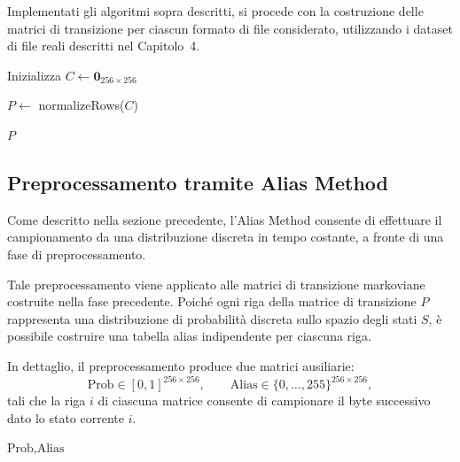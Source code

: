 \documentclass{report}
\begin{document}
\bigskip

Implementati gli algoritmi sopra descritti, si procede con la costruzione delle matrici di transizione
per ciascun formato di file considerato, utilizzando i dataset di file reali
descritti nel Capitolo~4.

\bigskip

\begin{algorithm}[H]
\caption{BuildTransitionMatrix}


Inizializza $C \gets \mathbf{0}_{256 \times 256}$\;


$P \gets$ normalizeRows($C$)\;

\Return $P$\;
\end{algorithm}



\subsection{Preprocessamento tramite Alias Method}

Come descritto nella sezione precedente, l’Alias Method consente di effettuare
il campionamento da una distribuzione discreta in tempo costante, a fronte di
una fase di preprocessamento.

\bigskip

Tale preprocessamento viene applicato alle
matrici di transizione markoviane costruite nella fase precedente. Poiché ogni
riga della matrice di transizione \(P\) rappresenta una distribuzione di
probabilità discreta sullo spazio degli stati \(S\), è possibile costruire una
tabella alias indipendente per ciascuna riga.

\bigskip

In dettaglio, il preprocessamento produce due matrici ausiliarie:
\[
\text{Prob} \in [0,1]^{256 \times 256}, \qquad
\text{Alias} \in \{0,\dots,255\}^{256 \times 256},
\]
tali che la riga \(i\) di ciascuna matrice consente di campionare il byte
successivo dato lo stato corrente \(i\).

\bigskip

\begin{algorithm}[H]
\caption{PreprocessingAliasMethod}



\Return $\text{Prob}, \text{Alias}$\;
\end{algorithm}
\end{document}
